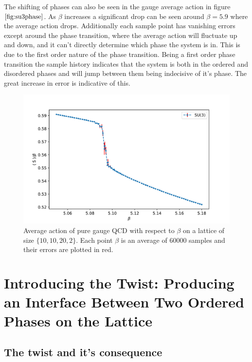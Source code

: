 \documentclass[english,twoside,openright]{UH_TCM_MSc}
\begin{document}
The shifting of phases can also be seen in the gauge average action in figure $\ref{fig:su3phase}$. As $\beta$ increases a significant drop can be seen around $\beta = 5.9$ where the average action drops. Additionally each sample point has vanishing errors except around the phase transition, where the average action will fluctuate up and down, and it can't directly determine which phase the system is in. This is due to the first order nature of the phase transition. Being a first order phase transition the sample history indicates that the system is both in the ordered and disordered phases and will jump between them being indecisive of it's phase. The great increase in error is indicative of this. 

\begin{figure}[htpb]
    \centering
    \includegraphics[width=\textwidth]{final_plots/misc/su3_phase_transition.pdf}
    \caption{Average action of pure gauge QCD with respect to $\beta$ on a lattice of size $\{10,10,20,2\}$. Each point $\beta$ is an average of 60000 samples and their errors are plotted in red.}
    \label{fig:su3phase}
\end{figure}

\chapter{Introducing the Twist: Producing an Interface Between Two Ordered Phases on the Lattice}


\section{The twist and it's consequence}
\end{document}
